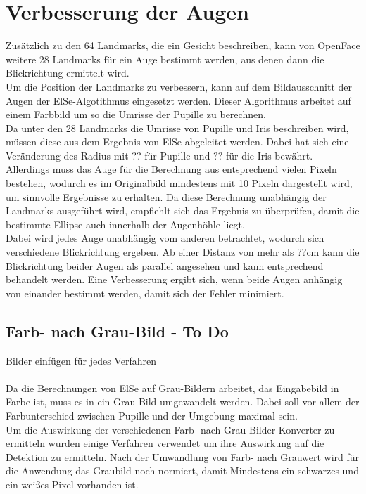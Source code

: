 \section{Verbesserung der Augen}
\label{verbesserung_ElSe}
Zusätzlich zu den 64 Landmarks, die ein Gesicht beschreiben, kann von OpenFace weitere 28 Landmarks für ein Auge bestimmt werden, aus denen dann die Blickrichtung ermittelt wird.\\
Um die Position der Landmarks zu verbessern, kann auf dem Bildausschnitt der Augen der ElSe-Algotithmus eingesetzt werden. Dieser Algorithmus arbeitet auf einem Farbbild um so die Umrisse der Pupille zu berechnen.\\
Da unter den 28 Landmarks die Umrisse von Pupille und Iris beschreiben wird, müssen diese aus dem Ergebnis von ElSe abgeleitet werden. Dabei hat sich eine Veränderung des Radius mit ?? für Pupille und ?? für die Iris bewährt.\\
Allerdings muss das Auge für die Berechnung aus entsprechend vielen Pixeln bestehen, wodurch es im Originalbild mindestens mit 10 Pixeln dargestellt wird, um sinnvolle Ergebnisse zu erhalten. Da diese Berechnung unabhängig der Landmarks ausgeführt wird, empfiehlt sich das Ergebnis zu überprüfen, damit die bestimmte Ellipse auch innerhalb der Augenhöhle liegt.\\
Dabei wird jedes Auge unabhängig vom anderen betrachtet, wodurch sich verschiedene Blickrichtung ergeben. Ab einer Distanz von mehr als ??cm kann die Blickrichtung beider Augen als parallel angesehen und kann entsprechend behandelt werden. Eine Verbesserung ergibt sich, wenn beide Augen anhängig von einander bestimmt werden, damit sich der Fehler minimiert.
\subsection{Farb- nach Grau-Bild - To Do}
Bilder einfügen für jedes Verfahren\\\\
Da die Berechnungen von ElSe auf Grau-Bildern arbeitet, das Eingabebild in Farbe ist, muss es in ein Grau-Bild umgewandelt werden. Dabei soll vor allem der Farbunterschied zwischen Pupille und der Umgebung maximal sein.\\
Um die Auswirkung der verschiedenen Farb- nach Grau-Bilder Konverter zu  ermitteln wurden einige Verfahren verwendet um ihre Auswirkung auf die Detektion zu ermitteln. Nach der Umwandlung von Farb- nach Grauwert wird für die Anwendung das Graubild noch normiert, damit Mindestens ein schwarzes und ein weißes Pixel vorhanden ist.
